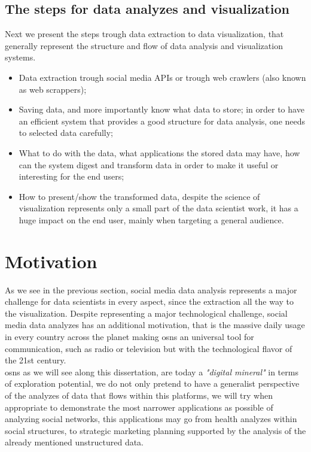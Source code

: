 \subsection*{The steps for data analyzes and visualization}

Next we present the steps trough data extraction to data visualization, that generally represent the structure and flow of data analysis and visualization systems.

\begin{itemize}
\item Data extraction trough social media APIs or trough web crawlers (also known as web scrappers);
\item Saving data, and more importantly know what data to store; in order to have an efficient system that provides a good structure for data analysis, one needs
to selected data carefully;
\item What to do with the data, what applications the stored data may have, how can the system digest and transform data in order to make it useful or interesting for the end users;
\item How to present/show the transformed data, despite the science of visualization represents only a small part of the data scientist work, it has a huge impact on the end user, mainly when targeting a general audience.
\end{itemize}

\section{Motivation}
As we see in the previous section, social media data analysis represents a major challenge for data scientists in every aspect, since the extraction all the way to the visualization. Despite representing a major technological challenge, social media data analyzes has an additional motivation, that is the massive daily usage in every country across the planet making \glspl{osn} an universal tool for communication, such as radio or television but with the technological flavor of the 21st century.\\
\indent \glspl{osn} as we will see along this dissertation, are today a \textit{"digital mineral"} in terms of exploration potential, we do not only pretend to have a generalist perspective of the analyzes of data that flows within this platforms, we will try when appropriate to demonstrate the most narrower applications as possible of analyzing social networks, this applications may go from health analyzes within social structures, to strategic marketing planning supported by the analysis of the already mentioned unstructured data.

